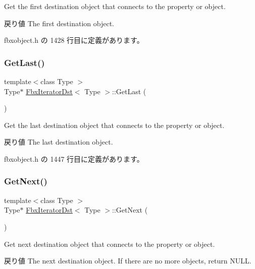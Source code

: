 Get the first destination object that connects to the property or object. \begin{DoxyReturn}{戻り値}
The first destination object. 
\end{DoxyReturn}


 fbxobject.\+h の 1428 行目に定義があります。

\mbox{\label{class_fbx_iterator_dst_ac3fdecd61bbc92465c40cb45a6557473}} 
\subsubsection{\texorpdfstring{Get\+Last()}{GetLast()}}
{\footnotesize\ttfamily template$<$class Type $>$ \\
Type$\ast$ \hyperlink{class_fbx_iterator_dst}{Fbx\+Iterator\+Dst}$<$ Type $>$\+::Get\+Last (\begin{DoxyParamCaption}{ }\end{DoxyParamCaption})\hspace{0.3cm}{\ttfamily [inline]}}

Get the last destination object that connects to the property or object. \begin{DoxyReturn}{戻り値}
The last destination object. 
\end{DoxyReturn}


 fbxobject.\+h の 1447 行目に定義があります。

\mbox{\label{class_fbx_iterator_dst_a576a29d2fed0e256026665daeae3eb03}} 
\subsubsection{\texorpdfstring{Get\+Next()}{GetNext()}}
{\footnotesize\ttfamily template$<$class Type $>$ \\
Type$\ast$ \hyperlink{class_fbx_iterator_dst}{Fbx\+Iterator\+Dst}$<$ Type $>$\+::Get\+Next (\begin{DoxyParamCaption}{ }\end{DoxyParamCaption})\hspace{0.3cm}{\ttfamily [inline]}}

Get next destination object that connects to the property or object. \begin{DoxyReturn}{戻り値}
The next destination object. If there are no more objects, return N\+U\+LL. 
\end{DoxyReturn}


